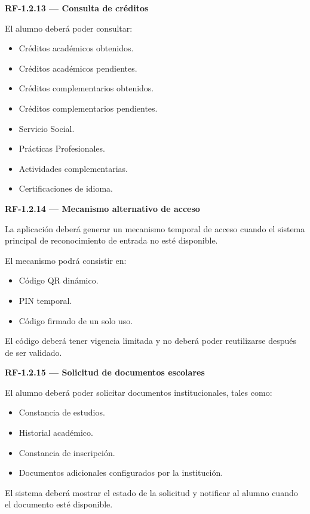 \documentclass[12pt,a4paper]{article}
\newcommand{\RF}[1]{\textbf{\color{primary}RF-#1}}
\newenvironment{requisito}[1]
{
\begin{center}
\begin{minipage}{0.96\textwidth}
\colorbox{requirement}{
\begin{minipage}{0.94\textwidth}
\textbf{#1}
\end{minipage}
}
\vspace{2mm}
}
{
\end{minipage}
\end{center}
}
\begin{document}
\begin{requisito}{\RF{1.2.13} --- Consulta de créditos}
El alumno deberá poder consultar:

\begin{itemize}[leftmargin=*]
\item Créditos académicos obtenidos.
\item Créditos académicos pendientes.
\item Créditos complementarios obtenidos.
\item Créditos complementarios pendientes.
\item Servicio Social.
\item Prácticas Profesionales.
\item Actividades complementarias.
\item Certificaciones de idioma.
\end{itemize}
\end{requisito}

\begin{requisito}{\RF{1.2.14} --- Mecanismo alternativo de acceso}
La aplicación deberá generar un mecanismo temporal de acceso cuando el sistema
principal de reconocimiento de entrada no esté disponible.

El mecanismo podrá consistir en:

\begin{itemize}[leftmargin=*]
\item Código QR dinámico.
\item PIN temporal.
\item Código firmado de un solo uso.
\end{itemize}

El código deberá tener vigencia limitada y no deberá poder reutilizarse después
de ser validado.
\end{requisito}

\begin{requisito}{\RF{1.2.15} --- Solicitud de documentos escolares}
El alumno deberá poder solicitar documentos institucionales, tales como:

\begin{itemize}[leftmargin=*]
\item Constancia de estudios.
\item Historial académico.
\item Constancia de inscripción.
\item Documentos adicionales configurados por la institución.
\end{itemize}

El sistema deberá mostrar el estado de la solicitud y notificar al alumno cuando
el documento esté disponible.
\end{requisito}
\end{document}
